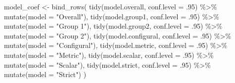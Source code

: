 \documentclass[
  man]{apa7}
\newenvironment{Shaded}{\begin{snugshade}}{\end{snugshade}}
\newcommand{\AttributeTok}[1]{\textcolor[rgb]{0.77,0.63,0.00}{#1}}
\newcommand{\DecValTok}[1]{\textcolor[rgb]{0.00,0.00,0.81}{#1}}
\newcommand{\FunctionTok}[1]{\textcolor[rgb]{0.00,0.00,0.00}{#1}}
\newcommand{\NormalTok}[1]{#1}
\newcommand{\OtherTok}[1]{\textcolor[rgb]{0.56,0.35,0.01}{#1}}
\newcommand{\SpecialCharTok}[1]{\textcolor[rgb]{0.00,0.00,0.00}{#1}}
\newcommand{\StringTok}[1]{\textcolor[rgb]{0.31,0.60,0.02}{#1}}
\begin{document}
\begin{Shaded}
\begin{Highlighting}[]
\NormalTok{  model\_coef }\OtherTok{\textless{}{-}} \FunctionTok{bind\_rows}\NormalTok{(}
    \FunctionTok{tidy}\NormalTok{(model.overall, }\AttributeTok{conf.level =}\NormalTok{ .}\DecValTok{95}\NormalTok{) }\SpecialCharTok{\%\textgreater{}\%} 
      \FunctionTok{mutate}\NormalTok{(}\AttributeTok{model =} \StringTok{"Overall"}\NormalTok{), }
    \FunctionTok{tidy}\NormalTok{(model.group1, }\AttributeTok{conf.level =}\NormalTok{ .}\DecValTok{95}\NormalTok{) }\SpecialCharTok{\%\textgreater{}\%} 
      \FunctionTok{mutate}\NormalTok{(}\AttributeTok{model =} \StringTok{"Group 1"}\NormalTok{), }
    \FunctionTok{tidy}\NormalTok{(model.group2, }\AttributeTok{conf.level =}\NormalTok{ .}\DecValTok{95}\NormalTok{) }\SpecialCharTok{\%\textgreater{}\%} 
      \FunctionTok{mutate}\NormalTok{(}\AttributeTok{model =} \StringTok{"Group 2"}\NormalTok{), }
    \FunctionTok{tidy}\NormalTok{(model.configural, }\AttributeTok{conf.level =}\NormalTok{ .}\DecValTok{95}\NormalTok{) }\SpecialCharTok{\%\textgreater{}\%} 
      \FunctionTok{mutate}\NormalTok{(}\AttributeTok{model =} \StringTok{"Configural"}\NormalTok{), }
    \FunctionTok{tidy}\NormalTok{(model.metric, }\AttributeTok{conf.level =}\NormalTok{ .}\DecValTok{95}\NormalTok{) }\SpecialCharTok{\%\textgreater{}\%} 
      \FunctionTok{mutate}\NormalTok{(}\AttributeTok{model =} \StringTok{"Metric"}\NormalTok{), }
    \FunctionTok{tidy}\NormalTok{(model.scalar, }\AttributeTok{conf.level =}\NormalTok{ .}\DecValTok{95}\NormalTok{) }\SpecialCharTok{\%\textgreater{}\%} 
      \FunctionTok{mutate}\NormalTok{(}\AttributeTok{model =} \StringTok{"Scalar"}\NormalTok{), }
    \FunctionTok{tidy}\NormalTok{(model.strict, }\AttributeTok{conf.level =}\NormalTok{ .}\DecValTok{95}\NormalTok{) }\SpecialCharTok{\%\textgreater{}\%} 
      \FunctionTok{mutate}\NormalTok{(}\AttributeTok{model =} \StringTok{"Strict"}\NormalTok{)}
\NormalTok{  )}
    

\end{Highlighting}
\end{Shaded}
\end{document}
